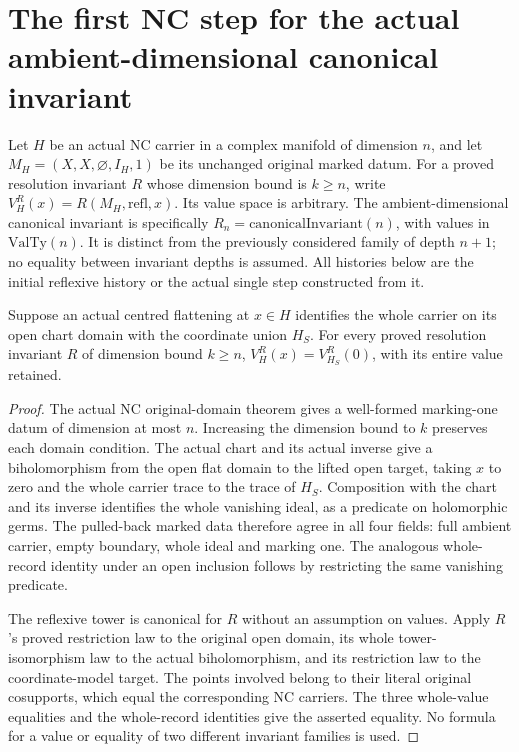 \section{The first NC step for the actual ambient-dimensional canonical invariant}
\label{sec:hironaka-normal-crossings-canonical-initial-step}

Let $H$ be an actual NC carrier in a complex manifold of dimension $n$,
and let $M_H=(X,X,\varnothing,I_H,1)$ be its unchanged original marked datum.
For a proved resolution invariant $R$ whose dimension bound is $k\geq n$,
write $V^R_H(x)=R(M_H,\mathrm{refl},x)$. Its value space is arbitrary.
The ambient-dimensional canonical invariant is specifically
$R_n=\mathrm{canonicalInvariant}(n)$, with values in $\mathrm{ValTy}(n)$.
It is distinct from the previously considered family of depth $n+1$;
no equality between invariant depths is assumed. All histories below are
the initial reflexive history or the actual single step constructed from it.

\begin{lemma}
\label{hir:general-nc-generic-initial-value-flat-chart}
\leanok
{}
Suppose an actual centred flattening at $x\in H$ identifies the whole
carrier on its open chart domain with the coordinate union $H_S$.
For every proved resolution invariant $R$ of dimension bound $k\geq n$,
$V^R_H(x)=V^R_{H_S}(0)$, with its entire value retained.
\end{lemma}
\begin{proof}
The actual NC original-domain theorem gives a well-formed marking-one
datum of dimension at most $n$. Increasing the dimension bound to $k$
preserves each domain condition. The actual chart and its actual inverse
give a biholomorphism from the open flat domain to the lifted open target,
taking $x$ to zero and the whole carrier trace to the trace of $H_S$.
Composition with the chart and its inverse identifies the whole vanishing
ideal, as a predicate on holomorphic germs. The pulled-back marked data
therefore agree in all four fields: full ambient carrier, empty boundary,
whole ideal and marking one. The analogous whole-record identity under
an open inclusion follows by restricting the same vanishing predicate.

The reflexive tower is canonical for $R$ without an assumption on values.
Apply $R$'s proved restriction law to the original open domain, its whole
tower-isomorphism law to the actual biholomorphism, and its restriction
law to the coordinate-model target. The points involved belong to their
literal original cosupports, which equal the corresponding NC carriers.
The three whole-value equalities and the whole-record identities give
the asserted equality. No formula for a value or equality of two different
invariant families is used.
\end{proof}

